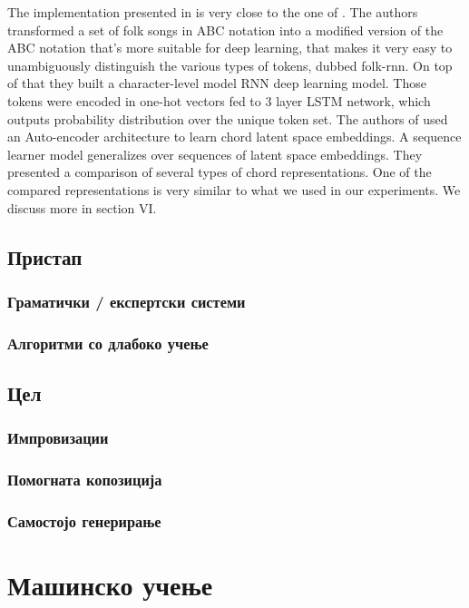 The implementation presented in \cite{Sturm2015} is very close to the one of \cite{AndrejKarpathy2015}. The authors transformed a set of folk songs in ABC notation into a modified version of the ABC notation that's more suitable for deep learning, that makes it very easy to unambiguously distinguish the various types of tokens, dubbed folk-rnn. On top of that they built a character-level model RNN deep learning model. Those tokens were encoded in one-hot vectors fed to 3 layer LSTM network, which outputs probability distribution over the unique token set. 
The authors of \cite{Madjiheurem2016} used an Auto-encoder architecture to learn chord latent space embeddings. A sequence learner model generalizes over sequences of latent space embeddings. They presented a comparison of several types of chord representations. One of the compared representations is very similar to what we used in our experiments. We discuss more in section VI.

\section{Пристап}

\subsection{Граматички / експертски системи} 
\subsection{Алгоритми со длабоко учење} 

\section{Цел}



\subsection{Импровизации} 
\subsection{Помогната копозиција} 
\subsection{Самостојо генерирање} 

\chapter{Машинско учење}

